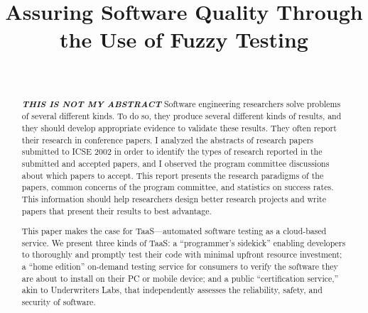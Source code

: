\documentclass[10pt, final, journal, letterpaper, twoside, twocolumn]{IEEEtran}
\begin{document}
\title{Assuring Software Quality Through the Use of Fuzzy Testing}
\author{ \\
	}

\maketitle


\begin{abstract}
	\textbf{\textit{THIS IS NOT MY ABSTRACT}} Software engineering researchers solve problems of several different kinds. To do so, they produce several different kinds of results, and they should develop appropriate evidence to validate these results. They often report their research in conference papers. I analyzed the abstracts of research papers submitted to ICSE 2002 in order to identify the types of research reported in the submitted and accepted papers, and I observed the program committee discussions about which papers to accept. This report presents the research paradigms of the papers, common concerns of the program committee, and statistics on success rates. This information should help researchers design better research projects and write papers that present their results to best advantage. 
	
	This paper makes the case for TaaS—automated software testing as a cloud-based service. We present three kinds of TaaS: a “programmer’s sidekick” enabling developers to thoroughly and promptly test their code with minimal upfront resource investment; a “home edition” on-demand testing service for consumers to verify the software they are about to install on their PC or mobile device; and a public “certification service,” akin to Underwriters Labs, that independently assesses the reliability, safety, and security of software.
\end{abstract}
\end{document}
